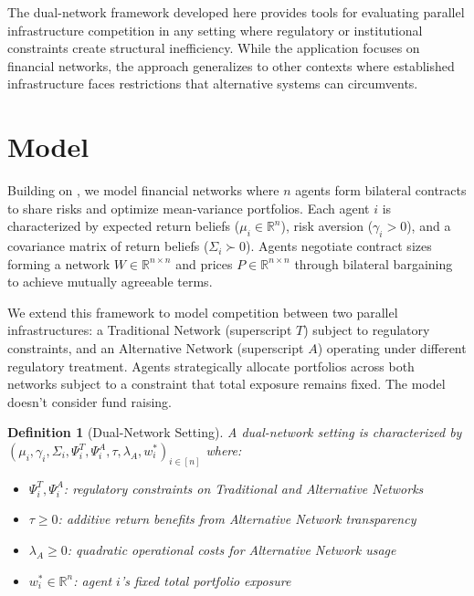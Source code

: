 \documentclass[12pt]{article}
\newtheorem{definition}[theorem]{Definition}
\begin{document}
The dual-network framework developed here provides tools for evaluating parallel infrastructure competition in any setting where regulatory or institutional constraints create structural inefficiency. While the application focuses on financial networks, the approach generalizes to other contexts where established infrastructure faces restrictions that alternative systems can circumvents.


\section{Model}
\label{sec:model}

Building on \citet{jalan_incentive-aware_2024}, we model financial networks where $n$ agents form bilateral contracts to share risks and optimize mean-variance portfolios. Each agent $i$ is characterized by expected return beliefs ($\mu_i \in \mathbb{R}^n$), risk aversion ($\gamma_i > 0$), and a covariance matrix of return beliefs ($\Sigma_i \succ 0$). Agents negotiate contract sizes forming a network $W \in \mathbb{R}^{n \times n}$ and prices $P \in \mathbb{R}^{n \times n}$ through bilateral bargaining to achieve mutually agreeable terms.

We extend this framework to model competition between two parallel infrastructures: a Traditional Network (superscript $T$) subject to regulatory constraints, and an Alternative Network (superscript $A$) operating under different regulatory treatment. Agents strategically allocate portfolios across both networks subject to a constraint that total exposure remains fixed. The model doesn't consider fund raising.



\begin{definition}[Dual-Network Setting]
\label{def:dual_network}
A dual-network setting is characterized by \\ $(\mu_i, \gamma_i, \Sigma_i, \Psi_i^T, \Psi_i^A, \tau, \lambda_A, w_i^*)_{i \in [n]}$ where:
\begin{itemize}[noitemsep]
    \item $\Psi_i^T, \Psi_i^A$: regulatory constraints on Traditional and Alternative Networks
    \item $\tau \geq 0$: additive return benefits from Alternative Network transparency
    \item $\lambda_A \geq 0$: quadratic operational costs for Alternative Network usage
    \item $w_i^* \in \mathbb{R}^n$: agent $i$'s fixed total portfolio exposure
\end{itemize}
\end{definition}
\end{document}
